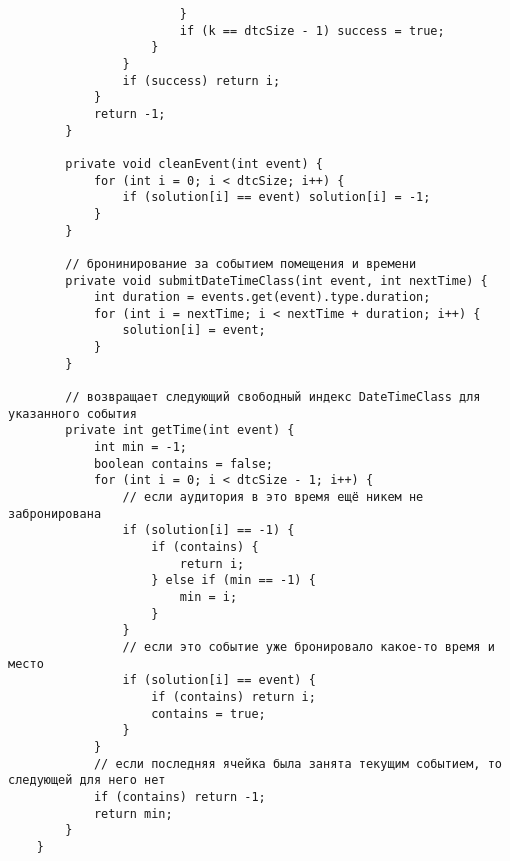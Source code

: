 \begin{lstlisting}
						}
						if (k == dtcSize - 1) success = true;
					}
				}
				if (success) return i;
			}
			return -1;
		}
		
		private void cleanEvent(int event) {
			for (int i = 0; i < dtcSize; i++) {
				if (solution[i] == event) solution[i] = -1;
			}
		}
		
		// бронинирование за событием помещения и времени
		private void submitDateTimeClass(int event, int nextTime) {
			int duration = events.get(event).type.duration;
			for (int i = nextTime; i < nextTime + duration; i++) {
				solution[i] = event;
			}
		}
		
		// возвращает следующий свободный индекс DateTimeClass для указанного события
		private int getTime(int event) {
			int min = -1;
			boolean contains = false;
			for (int i = 0; i < dtcSize - 1; i++) {
				// если аудитория в это время ещё никем не забронирована
				if (solution[i] == -1) {
					if (contains) {
						return i;
					} else if (min == -1) {
						min = i;
					}
				}
				// если это событие уже бронировало какое-то время и место
				if (solution[i] == event) {
					if (contains) return i;
					contains = true;
				}
			}
			// если последняя ячейка была занята текущим событием, то следующей для него нет
			if (contains) return -1;
			return min;
		}
	}
\end{lstlisting}